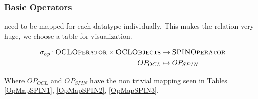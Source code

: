 \documentclass[runningheads]{llncs}
\begin{document}
\subsubsection{Basic Operators}
need to be mapped for each datatype individually.
This makes the relation very huge, we choose a table for visualization.
\begin{definition}
    \begin{align*}
        \sigma_{op}\colon\textsc{OCLOperator}\times\textsc{OCLObjects} & \to\textsc{SPINOperator} \\
        OP_{OCL}                                                       & \mapsto OP_{SPIN}
    \end{align*}
\end{definition}
Where \(OP_{OCL}\) and \(OP_{SPIN}\) have the non trivial mapping seen in Tables \ref{OpMapSPIN1}, \ref{OpMapSPIN2}, \ref{OpMapSPIN3}.
\end{document}
